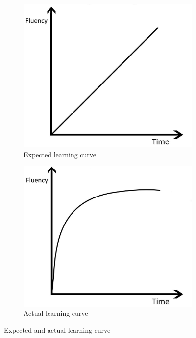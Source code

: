\begin{figure}[H]
    \centering
    \begin{subfigure}[b]{0.4\textwidth}
        \includegraphics[width=\textwidth]{images/expected.jpg}
        \caption{Expected learning curve}
    \end{subfigure}
    \begin{subfigure}[b]{0.4\textwidth}
        \includegraphics[width=\textwidth]{images/actual.jpg}
        \caption{Actual learning curve}
    \end{subfigure}
    \caption{Expected and actual learning curve}
\end{figure}

